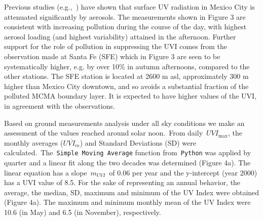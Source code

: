 \documentclass{article}
\begin{document}
{Previous studies (e.g.,~\cite{Castro_2001,Palancar_2012}) have shown that surface UV
radiation in Mexico City is attenuated significantly by aerosols. The
measurements shown in Figure 3 %
are consistent with increasing pollution during the course of the day, with
highest aerosol loading (and highest variability) attained in the
afternoon. Further support for the role of pollution in suppressing the
UVI comes from the observation made at Santa Fe (SFE) which in
Figure 3 %
are seen to be systematically
higher, e.g. by over 10\% in autumn afternoons, compared to the other
stations. The SFE station is located at 2600 m asl, approximately 300 m
higher than Mexico City downtown, and so avoids a substantial fraction
of the polluted MCMA boundary layer. It is expected to have higher
values of the UVI, in agreement with the observations.

Based on ground measurements analysis under all sky conditions we make
an assessment of the values reached around solar noon.~From
daily~\(UVI_{\max}\), the monthly averages (\(\overline{UVI_m}\)) and
Standard Deviations (SD) were
calculated.~The~\texttt{Simple\ Moving\ Average} function
from~\texttt{Python} was applied by quarter and a linear fit along the
two decades was determined (Figure 4a).%
The linear equation has a slope~\(m_{UVI}\)~of 0.06 per year and
the y-intercept (year 2000) has a UVI value of 8.5. For the sake of
representing an annual behavior, the average, the median, SD, maximum
and minimum of the UV Index were obtained
(Figure 4a).%
The maximum and minimum
monthly mean of the UV Index were 10.6 (in May) and 6.5 (in November),
respectively.

}
\end{document}

